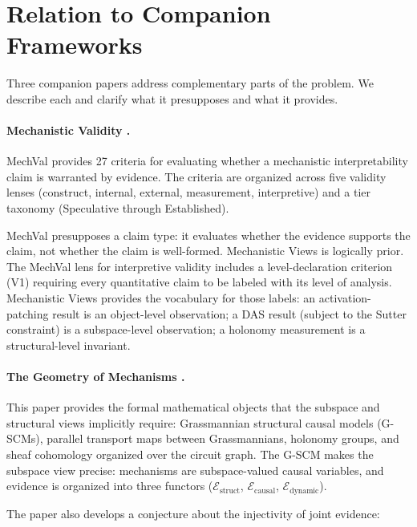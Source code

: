 \documentclass[11pt]{article}
\theoremstyle{remark}
\begin{document}
\section{Relation to Companion Frameworks}\label{sec:companions}

Three companion papers address complementary parts of the problem.  We
describe each and clarify what it presupposes and what it provides.

\paragraph{Mechanistic Validity \citep{tower2026mechval}.}
MechVal provides 27 criteria for evaluating whether a mechanistic
interpretability claim is warranted by evidence.  The criteria are
organized across five validity lenses (construct, internal, external,
measurement, interpretive) and a tier taxonomy (Speculative through
Established).

MechVal presupposes a claim type: it evaluates whether the evidence
supports the claim, not whether the claim is well-formed.  Mechanistic
Views is logically prior.  The MechVal lens for interpretive validity
includes a level-declaration criterion (V1) requiring every quantitative
claim to be labeled with its level of analysis.  Mechanistic Views
provides the vocabulary for those labels: an activation-patching result
is an object-level observation; a DAS result (subject to the Sutter
constraint) is a subspace-level observation; a holonomy measurement is
a structural-level invariant.

\paragraph{The Geometry of Mechanisms \citep{tower2026geom}.}
This paper provides the formal mathematical objects that the subspace
and structural views implicitly require: Grassmannian structural causal
models (G-SCMs), parallel transport maps between Grassmannians, holonomy
groups, and sheaf cohomology organized over the circuit graph.  The
G-SCM makes the subspace view precise: mechanisms are subspace-valued
causal variables, and evidence is organized into three functors
($\mathcal{E}_{\mathrm{struct}}$, $\mathcal{E}_{\mathrm{causal}}$,
$\mathcal{E}_{\mathrm{dynamic}}$).

The paper also develops a conjecture about the injectivity of joint
evidence:
\end{document}
